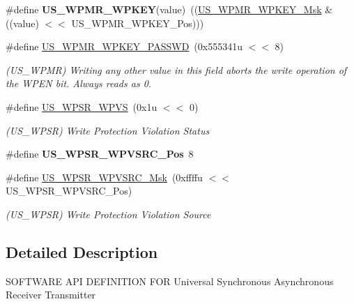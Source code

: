 \begin{DoxyCompactItemize}
\mbox{\label{group__SAMS70__USART_ga92f71dcb8627780f24fc0bca4fb16f7a}} 
\#define {\bfseries U\+S\+\_\+\+W\+P\+M\+R\+\_\+\+W\+P\+K\+EY}(value)~((\mbox{\hyperlink{group__SAMV71__USART_ga68e18606d5ce0c902f7078f5e84a95b8}{U\+S\+\_\+\+W\+P\+M\+R\+\_\+\+W\+P\+K\+E\+Y\+\_\+\+Msk}} \& ((value) $<$$<$ U\+S\+\_\+\+W\+P\+M\+R\+\_\+\+W\+P\+K\+E\+Y\+\_\+\+Pos)))
\item 
\mbox{\label{group__SAMS70__USART_ga5bcadc89cde78bdf6b072773956e7e29}} 
\#define \mbox{\hyperlink{group__SAMS70__USART_ga5bcadc89cde78bdf6b072773956e7e29}{U\+S\+\_\+\+W\+P\+M\+R\+\_\+\+W\+P\+K\+E\+Y\+\_\+\+P\+A\+S\+S\+WD}}~(0x555341u $<$$<$ 8)
\begin{DoxyCompactList}\small\item\em (U\+S\+\_\+\+W\+P\+MR) Writing any other value in this field aborts the write operation of the W\+P\+EN bit. Always reads as 0. \end{DoxyCompactList}\item 
\mbox{\label{group__SAMS70__USART_gacf130470a00a755e30a2bf46a9ccbbbd}} 
\#define \mbox{\hyperlink{group__SAMS70__USART_gacf130470a00a755e30a2bf46a9ccbbbd}{U\+S\+\_\+\+W\+P\+S\+R\+\_\+\+W\+P\+VS}}~(0x1u $<$$<$ 0)
\begin{DoxyCompactList}\small\item\em (U\+S\+\_\+\+W\+P\+SR) Write Protection Violation Status \end{DoxyCompactList}\item 
\mbox{\label{group__SAMS70__USART_gac198da9d630bfa55ed0d2ce929f49d73}} 
\#define {\bfseries U\+S\+\_\+\+W\+P\+S\+R\+\_\+\+W\+P\+V\+S\+R\+C\+\_\+\+Pos}~8
\item 
\mbox{\label{group__SAMS70__USART_ga4241a13f49c2c191c0080cce67d4aa90}} 
\#define \mbox{\hyperlink{group__SAMS70__USART_ga4241a13f49c2c191c0080cce67d4aa90}{U\+S\+\_\+\+W\+P\+S\+R\+\_\+\+W\+P\+V\+S\+R\+C\+\_\+\+Msk}}~(0xffffu $<$$<$ U\+S\+\_\+\+W\+P\+S\+R\+\_\+\+W\+P\+V\+S\+R\+C\+\_\+\+Pos)
\begin{DoxyCompactList}\small\item\em (U\+S\+\_\+\+W\+P\+SR) Write Protection Violation Source \end{DoxyCompactList}\end{DoxyCompactItemize}


\subsection{Detailed Description}
S\+O\+F\+T\+W\+A\+RE A\+PI D\+E\+F\+I\+N\+I\+T\+I\+ON F\+OR Universal Synchronous Asynchronous Receiver Transmitter 